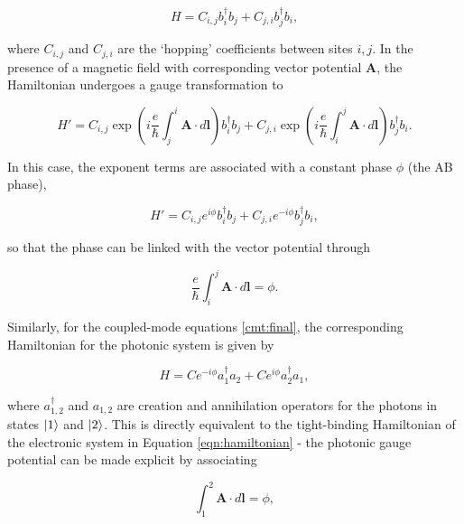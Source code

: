 \begin{equation}
H = C_{i,j} b_i^\dagger b_j + C_{j,i} b_j^\dagger b_i,
\label{eqn:hamiltonian}
\end{equation}

where $C_{i,j}$ and $C_{j,i}$ are the `hopping' coefficients between sites $i,j$. In the presence of a magnetic field with corresponding vector potential $\bm{A}$, the Hamiltonian undergoes a gauge transformation \cite{peierls2014} to

\begin{equation}
H' = C_{i,j} \exp({i \frac{e}{\hbar} \int_j^i \bm{A} \cdot d\bm{l}}) b_i^\dagger b_j + C_{j,i} \exp({i \frac{e}{\hbar} \int_i^j \bm{A} \cdot d\bm{l}}) b_j^\dagger b_i.
\end{equation}

In this case, the exponent terms are associated with a constant phase $\phi$ (the AB phase),

\begin{equation}
H' = C_{i,j} e^{i \phi} b_i^\dagger b_j + C_{j,i} e^{-i \phi} b_j^\dagger b_i,
\end{equation}

so that the phase can be linked with the vector potential through

\begin{equation}
\dfrac{e}{\hbar} \int_{i}^{j} \bm{A} \cdot d \bm{l} = \phi.
\end{equation}

Similarly, for the coupled-mode equations \ref{cmt:final}, the corresponding Hamiltonian for the photonic system is given by

\begin{equation}
H = Ce^{-i \phi} a_1^\dagger a_2 + Ce^{i \phi} a_2^\dagger a_1,
\end{equation}

where $a_{1,2}^\dagger$ and $a_{1,2}$ are creation and annihilation operators for the photons in states $\ket{1}$ and $\ket{2}$. This is directly equivalent to the tight-binding Hamiltonian of the electronic system in Equation \ref{eqn:hamiltonian} - the photonic gauge potential can be made explicit by associating

\begin{equation}
\int_{1}^2 \bm{A} \cdot d \bm{l} = \phi,
\label{eqn:gauge}
\end{equation}

